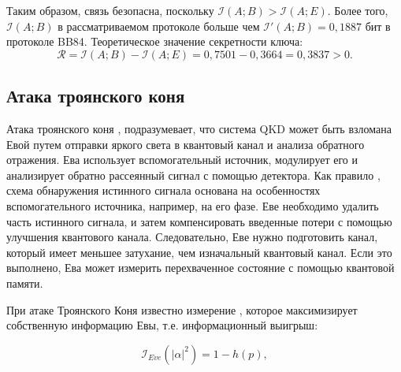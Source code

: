 \documentclass[a4paper,11pt]{article}
\begin{document}
Таким образом, связь безопасна, поскольку $\mathcal{I}(A; B) > \mathcal{I}(A; E)$. Более того, $\mathcal{I}(A; B)$ в рассматриваемом протоколе больше чем $\mathcal{I'} (A; B) = 0,1887$ бит в протоколе BB84.
Теоретическое значение секретности ключа:
\begin{equation*}
\mathcal{R} = \mathcal{I}(A; B) - \mathcal{I}(A; E) = 0,7501 - 0,3664 = 0,3837 > 0.
\end{equation*}


\subsection{Атака троянского коня}

Атака троянского коня \cite{trojan,trojan2, trojan4}, подразумевает, что система QKD может быть взломана Евой путем отправки яркого света в квантовый канал и анализа обратного отражения. Ева использует вспомогательный источник, модулирует его и анализирует обратно рассеянный сигнал с помощью детектора. Как правило \cite{trojan}, схема обнаружения истинного сигнала основана на особенностях вспомогательного источника, например, на его фазе. Еве необходимо удалить часть истинного сигнала, и затем компенсировать введенные потери с помощью улучшения квантового канала. Следовательно, Еве нужно подготовить канал, который имеет меньшее затухание, чем изначальный квантовый канал. Если это выполнено, Ева может измерить перехваченное состояние с помощью квантовой памяти.

\begin{figure}[h]
	\label{ris:image2}
\end{figure}


При атаке Троянского Коня известно измерение \cite{trojan, trojan3}, которое максимизирует собственную информацию Евы, т.е. информационный выигрыш:

\begin{equation*}
\mathcal{I}_{Eve}(|\alpha|^2) = 1 - h(p),
\end{equation*}
\end{document}

